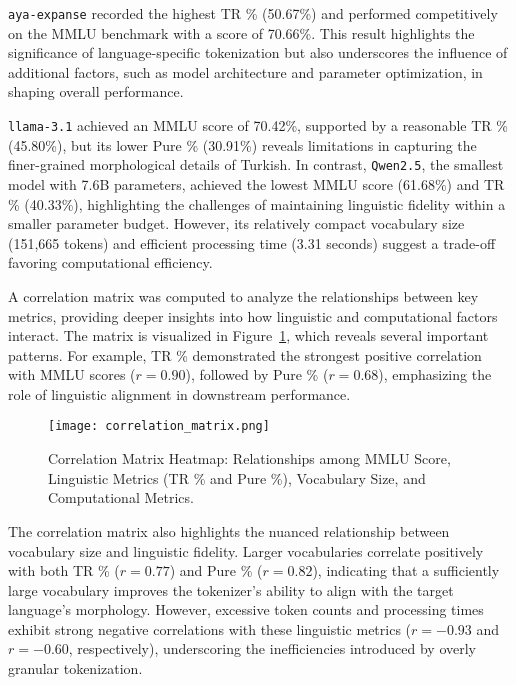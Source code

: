 \texttt{aya-expanse} recorded the highest TR \% (50.67\%) and performed competitively on the MMLU benchmark with a score of 70.66\%. This result highlights the significance of language-specific tokenization but also underscores the influence of additional factors, such as model architecture and parameter optimization, in shaping overall performance.

\texttt{llama-3.1} achieved an MMLU score of 70.42\%, supported by a reasonable TR \% (45.80\%), but its lower Pure \% (30.91\%) reveals limitations in capturing the finer-grained morphological details of Turkish. In contrast, \texttt{Qwen2.5}, the smallest model with 7.6B parameters, achieved the lowest MMLU score (61.68\%) and TR \% (40.33\%), highlighting the challenges of maintaining linguistic fidelity within a smaller parameter budget. However, its relatively compact vocabulary size (151,665 tokens) and efficient processing time (3.31 seconds) suggest a trade-off favoring computational efficiency.

A correlation matrix was computed to analyze the relationships between key metrics, providing deeper insights into how linguistic and computational factors interact. The matrix is visualized in Figure~\ref{fig:correlation_matrix}, which reveals several important patterns. For example, TR \% demonstrated the strongest positive correlation with MMLU scores (\(r = 0.90\)), followed by Pure \% (\(r = 0.68\)), emphasizing the role of linguistic alignment in downstream performance.

\begin{figure}[h!]
    \centering
    \texttt{[image: correlation\_matrix.png]}
    \caption{Correlation Matrix Heatmap: Relationships among MMLU Score, Linguistic Metrics (TR \% and Pure \%), Vocabulary Size, and Computational Metrics.}
    \label{fig:correlation_matrix}
\end{figure}
\FloatBarrier

The correlation matrix also highlights the nuanced relationship between vocabulary size and linguistic fidelity. Larger vocabularies correlate positively with both TR \% (\(r = 0.77\)) and Pure \% (\(r = 0.82\)), indicating that a sufficiently large vocabulary improves the tokenizer's ability to align with the target language's morphology. However, excessive token counts and processing times exhibit strong negative correlations with these linguistic metrics (\(r = -0.93\) and \(r = -0.60\), respectively), underscoring the inefficiencies introduced by overly granular tokenization.

